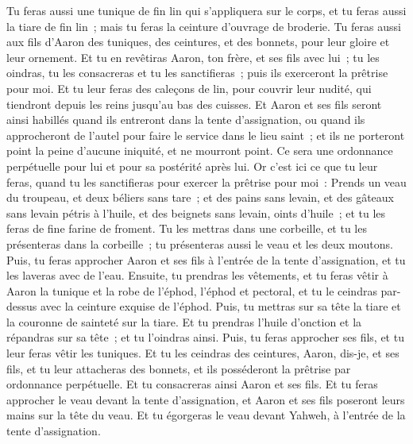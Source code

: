 \begin{multicols}{2}
Tu feras aussi une tunique de fin lin qui s'appliquera sur le corps, et tu feras aussi la tiare de fin lin~; mais tu feras la ceinture d'ouvrage de broderie.
Tu feras aussi aux fils d'Aaron des tuniques, des ceintures, et des bonnets, pour leur gloire et leur ornement.
Et tu en revêtiras Aaron, ton frère, et ses fils avec lui~; tu les oindras, tu les consacreras et tu les sanctifieras~; puis ils exerceront la prêtrise pour moi.
Et tu leur feras des caleçons de lin, pour couvrir leur nudité, qui tiendront depuis les reins jusqu'au bas des cuisses.
Et Aaron et ses fils seront ainsi habillés quand ils entreront dans la tente d'assignation, ou quand ils approcheront de l'autel pour faire le service dans le lieu saint~; et ils ne porteront point la peine d'aucune iniquité, et ne mourront point. Ce sera une ordonnance perpétuelle pour lui et pour sa postérité après lui.
\VerseOne{}Or c'est ici ce que tu leur feras, quand tu les sanctifieras pour exercer la prêtrise pour moi~: Prends un veau du troupeau, et deux béliers sans tare~;
et des pains sans levain, et des gâteaux sans levain pétris à l'huile, et des beignets sans levain, oints d'huile~; et tu les feras de fine farine de froment.
Tu les mettras dans une corbeille, et tu les présenteras dans la corbeille~; tu présenteras aussi le veau et les deux moutons.
Puis, tu feras approcher Aaron et ses fils à l'entrée de la tente d'assignation, et tu les laveras avec de l'eau.
Ensuite, tu prendras les vêtements, et tu feras vêtir à Aaron la tunique et la robe de l'éphod, l'éphod et pectoral, et tu le ceindras par-dessus avec la ceinture exquise de l'éphod.
Puis, tu mettras sur sa tête la tiare et la couronne de sainteté sur la tiare.
Et tu prendras l'huile d'onction et la répandras sur sa tête~; et tu l'oindras ainsi.
Puis, tu feras approcher ses fils, et tu leur feras vêtir les tuniques.
Et tu les ceindras des ceintures, Aaron, dis-je, et ses fils, et tu leur attacheras des bonnets, et ils posséderont la prêtrise par ordonnance perpétuelle. Et tu consacreras ainsi Aaron et ses fils.
Et tu feras approcher le veau devant la tente d'assignation, et Aaron et ses fils poseront leurs mains sur la tête du veau.
Et tu égorgeras le veau devant Yahweh, à l'entrée de la tente d'assignation.

\end{multicols}
